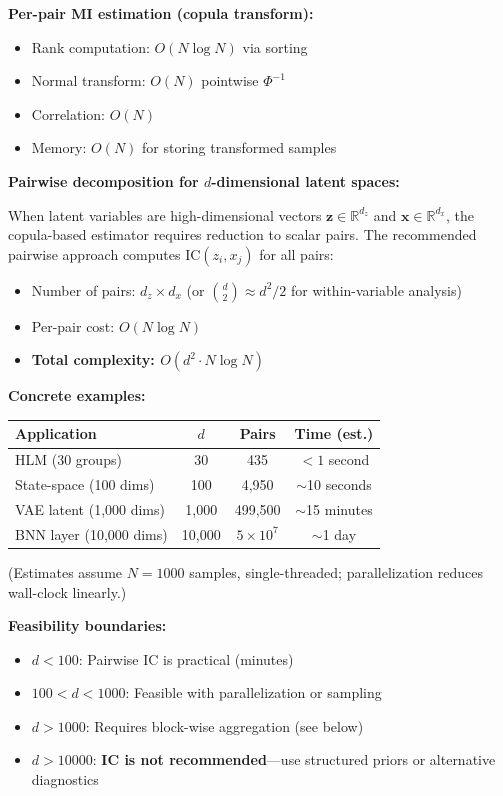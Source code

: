 \documentclass[10pt]{article} %
\theoremstyle{plain}
\theoremstyle{definition}
\newcommand{\IC}{\mathrm{IC}}  %
\begin{document}
\begin{tcolorbox}[breakable, colback=gray!5, colframe=black!75, title=\textbf{Computational Complexity of IC Estimation}, fonttitle=\bfseries]
\textbf{Per-pair MI estimation (copula transform):}
\begin{itemize}
    \item Rank computation: $O(N \log N)$ via sorting
    \item Normal transform: $O(N)$ pointwise $\Phi^{-1}$
    \item Correlation: $O(N)$
    \item Memory: $O(N)$ for storing transformed samples
\end{itemize}

\textbf{Pairwise decomposition for $d$-dimensional latent spaces:}

When latent variables are high-dimensional vectors $\mathbf{z} \in \mathbb{R}^{d_z}$ and $\mathbf{x} \in \mathbb{R}^{d_x}$, the copula-based estimator requires reduction to scalar pairs. The recommended pairwise approach computes $\IC(z_i, x_j)$ for all pairs:
\begin{itemize}
    \item Number of pairs: $d_z \times d_x$ (or $\binom{d}{2} \approx d^2/2$ for within-variable analysis)
    \item Per-pair cost: $O(N \log N)$
    \item \textbf{Total complexity: $O(d^2 \cdot N \log N)$}
\end{itemize}

\textbf{Concrete examples:}
\begin{center}
\begin{tabular}{lccc}
\toprule
Application & $d$ & Pairs & Time (est.) \\
\midrule
HLM (30 groups) & 30 & 435 & $<1$ second \\
State-space (100 dims) & 100 & 4,950 & $\sim$10 seconds \\
VAE latent (1,000 dims) & 1,000 & 499,500 & $\sim$15 minutes \\
BNN layer (10,000 dims) & 10,000 & $5 \times 10^7$ & $\sim$1 day \\
\bottomrule
\end{tabular}
\end{center}
(Estimates assume $N = 1000$ samples, single-threaded; parallelization reduces wall-clock linearly.)

\textbf{Feasibility boundaries:}
\begin{itemize}
    \item $d < 100$: Pairwise IC is practical (minutes)
    \item $100 < d < 1000$: Feasible with parallelization or sampling
    \item $d > 1000$: Requires block-wise aggregation (see below)
    \item $d > 10000$: \textbf{IC is not recommended}---use structured priors or alternative diagnostics
\end{itemize}


\end{tcolorbox}
\end{document}
